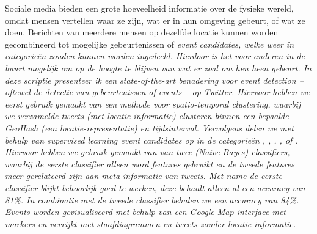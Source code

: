 {}
Sociale media bieden een grote hoeveelheid informatie over de fysieke wereld, 
omdat mensen vertellen waar ze zijn, wat er in hun
omgeving gebeurt, of wat ze doen. Berichten van meerdere mensen op dezelfde
locatie kunnen worden gecombineerd tot mogelijke gebeurtenissen of \it{event candidates},
welke weer in categorie\"en zouden kunnen worden ingedeeld.
Hierdoor is het voor anderen in de buurt mogelijk om op de hoogte te blijven van wat er zoal
om hen heen gebeurt.
\vl
In deze scriptie presenteer ik een \it{state-of-the-art} benadering voor 
\it{event detection} – oftewel de detectie van gebeurtenissen of \it{events} – 
op Twitter. Hiervoor hebben we eerst
gebruik gemaakt van een methode voor \it{spatio-temporal clustering}, waarbij 
we verzamelde tweets (met locatie-informatie) clusteren binnen een bepaalde \it{GeoHash} (een locatie-representatie) en 
tijdsinterval. Vervolgens delen we met behulp van \it{supervised learning} event candidates op in de categorie\"en , 
, , ,
 of . Hiervoor hebben we gebruik gemaakt van van twee
(\it{Naive Bayes}) \it{classifiers}, waarbij de eerste classifier alleen 
\it{word features}
gebruikt en de tweede features meer gerelateerd zijn aan 
\it{meta-informatie} van tweets.
Met name de eerste classifier blijkt behoorlijk goed te werken, deze behaalt 
alleen al een \it{accuracy} van 81\%. In combinatie met de tweede classifier
behalen we een accuracy van 84\%. Events worden gevisualiseerd met behulp
van een \it{Google Map interface} met \it{markers} en verrijkt met staafdiagrammen en
tweets zonder locatie-informatie.
\vspace{\fill}

\newpage

